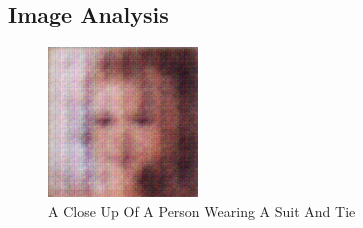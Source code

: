 \documentclass{article}%
\begin{document}
%
\subsection{Image Analysis}%
\label{subsec:ImageAnalysis}%


\begin{figure}[h!]%
\centering%
\includegraphics[width=150px]{500_fake_images/samples_5_353.png}%
\caption{A Close Up Of A Person Wearing A Suit And Tie}%
\end{figure}

%
\end{document}
